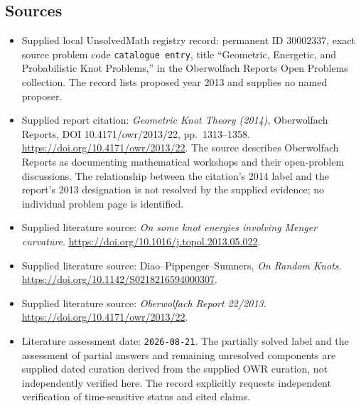 \documentclass[11pt]{article}
\begin{document}
\subsection{Sources}
\begin{itemize}
\item Supplied local UnsolvedMath registry record: permanent ID \(30002337\), exact source problem code \texttt{catalogue entry}, title ``Geometric, Energetic, and Probabilistic Knot Problems,'' in the Oberwolfach Reports Open Problems collection. The record lists proposed year 2013 and supplies no named proposer.
\item Supplied report citation: \emph{Geometric Knot Theory (2014)}, Oberwolfach Reports, DOI 10.4171/owr/2013/22, pp.~1313--1358. \url{https://doi.org/10.4171/owr/2013/22}. The source describes Oberwolfach Reports as documenting mathematical workshops and their open-problem discussions. The relationship between the citation's 2014 label and the report's 2013 designation is not resolved by the supplied evidence; no individual problem page is identified.
\item Supplied literature source: \emph{On some knot energies involving Menger curvature}. \url{https://doi.org/10.1016/j.topol.2013.05.022}.
\item Supplied literature source: Diao--Pippenger--Sumners, \emph{On Random Knots}. \url{https://doi.org/10.1142/S0218216594000307}.
\item Supplied literature source: \emph{Oberwolfach Report 22/2013}. \url{https://doi.org/10.4171/owr/2013/22}.
\item Literature assessment date: \texttt{2026-08-21}. The partially solved label and the assessment of partial answers and remaining unresolved components are supplied dated curation derived from the supplied OWR curation, not independently verified here. The record explicitly requests independent verification of time-sensitive status and cited claims.
\end{itemize}
\end{document}

